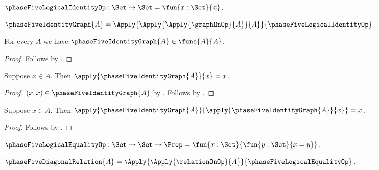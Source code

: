 

\begin{definition}\label{phase5_logical_identity}
    $\phaseFiveLogicalIdentityOp:\Set\to\Set
        =\fun{x:\Set}{x}$.
\end{definition}

\begin{definition}\label{phase5_named_identity_graph}
    $\phaseFiveIdentityGraph{A}
        =\Apply{\Apply{\Apply{\graphOnOp}{A}}{A}}
            {\phaseFiveLogicalIdentityOp}$.
\end{definition}

\begin{proposition}\label{phase5_named_identity_graph_function}
    For every $A$ we have $\phaseFiveIdentityGraph{A}\in\funs{A}{A}$.
\end{proposition}
\begin{proof}
    Follows by
        .
\end{proof}

\begin{proposition}\label{phase5_named_identity_graph_application}
    Suppose $x\in A$.
    Then $\apply{\phaseFiveIdentityGraph{A}}{x}=x$.
\end{proposition}
\begin{proof}
    $(x,x)\in\phaseFiveIdentityGraph{A}$ by
        .
    Follows by
        .
\end{proof}

\begin{proposition}\label{phase5_named_identity_graph_downstream}
    Suppose $x\in A$.
    Then $\apply{\phaseFiveIdentityGraph{A}}
        {\apply{\phaseFiveIdentityGraph{A}}{x}}=x$.
\end{proposition}
\begin{proof}
    Follows by .
\end{proof}

\begin{definition}\label{phase5_logical_equality}
    $\phaseFiveLogicalEqualityOp:\Set\to\Set\to\Prop
        =\fun{x:\Set}{\fun{y:\Set}{x=y}}$.
\end{definition}

\begin{definition}\label{phase5_named_diagonal_relation}
    $\phaseFiveDiagonalRelation{A}
        =\Apply{\Apply{\relationOnOp}{A}}{\phaseFiveLogicalEqualityOp}$.
\end{definition}

